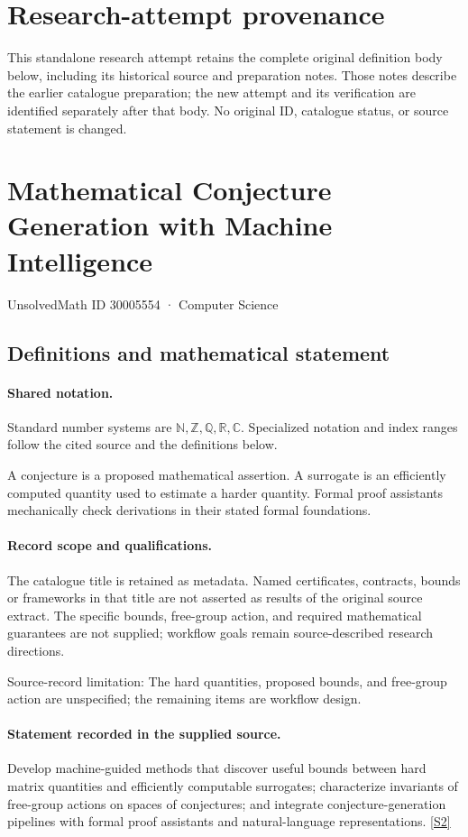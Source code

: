 \documentclass[11pt]{article}
\begin{document}
\section*{Research-attempt provenance}
This standalone research attempt retains the complete original definition body below,
including its historical source and preparation notes. Those notes describe the
earlier catalogue preparation; the new attempt and its verification are identified
separately after that body. No original ID, catalogue status, or source statement is changed.

\section{Mathematical Conjecture Generation with Machine Intelligence}\label{30005554}
{\small UnsolvedMath ID 30005554 · Computer Science}
\subsection{Definitions and mathematical statement}

\paragraph{Shared notation.}Standard number systems are $\mathbb N,\mathbb Z,\mathbb Q,\mathbb R,\mathbb C$. Specialized notation and index ranges follow the cited source and the definitions below.


A conjecture is a proposed mathematical assertion. A surrogate is an efficiently computed quantity used to estimate a harder quantity. Formal proof assistants mechanically check derivations in their stated formal foundations.
\paragraph{Record scope and qualifications.}
The catalogue title is retained as metadata. Named certificates, contracts, bounds or frameworks in that title are not asserted as results of the original source extract.
The specific bounds, free-group action, and required mathematical guarantees are not supplied; workflow goals remain source-described research directions.

Source-record limitation: The hard quantities, proposed bounds, and free-group action are unspecified; the remaining items are workflow design.
\paragraph{Statement recorded in the supplied source.}
Develop machine-guided methods that discover useful bounds between hard matrix quantities and efficiently computable surrogates; characterize invariants of free-group actions on spaces of conjectures; and integrate conjecture-generation pipelines with formal proof assistants and natural-language representations. \href{https://doi.org/10.4171/owr/2023/26}{[S2]}
\end{document}
